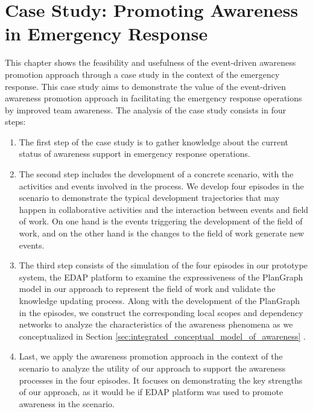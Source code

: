 \graphicspath{{Figures/}}

\chapter{Case Study: Promoting Awareness in Emergency Response} %
\label{cha:case_studies}

This chapter shows the feasibility and usefulness of the event-driven awareness promotion approach through a case study in the context of the emergency response. This case study aims to demonstrate the value of the event-driven awareness promotion approach in facilitating the emergency response operations by improved team awareness. The analysis of the case study consists in four steps:

\begin{enumerate}
	\item The first step of the case study is to gather knowledge about the current status of awareness support in emergency response operations.
	\item The second step includes the development of a concrete scenario, with the activities and events involved in the process. We develop four episodes in the scenario to demonstrate the typical development trajectories that may happen in collaborative activities and the interaction between events and field of work. On one hand is the events triggering the development of the field of work, and on the other hand is the changes to the field of work generate new events. 
	\item The third step consists of the simulation of the four episodes in our prototype system, the EDAP platform to examine the expressiveness of the PlanGraph model in our approach to represent the field of work and validate the knowledge updating process. Along with the development of the PlanGraph in the episodes, we construct the corresponding local scopes and dependency networks to analyze the characteristics of the awareness phenomena as we conceptualized in Section \ref{sec:integrated_conceptual_model_of_awareness} .
	\item Last, we apply the awareness promotion approach in the context of the scenario to analyze the utility of our approach to support the awareness processes in the four episodes. It focuses on demonstrating the key strengths of our approach, as it would be if EDAP platform was used to promote awareness in the scenario.
\end{enumerate}

